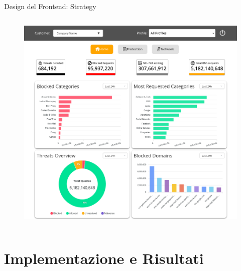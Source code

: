 \documentclass[8pt]{beamer}
\begin{document}
\begin{frame}[fragile]{Design del Frontend: Strategy}
\begin{columns}[T]
\begin{figure}
      \includegraphics[width=\textwidth]{figures/home.png}
    \end{figure}

  \end{columns}
\end{frame}


\section{Implementazione e Risultati}
\end{document}
